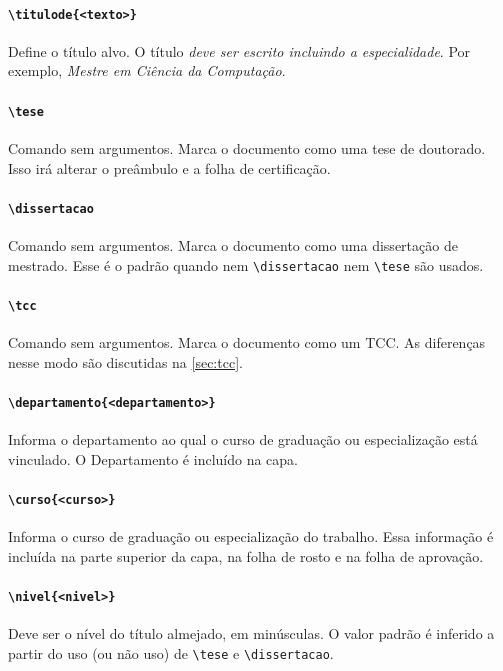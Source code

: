 \documentclass[embeddedlogo]{../ufsc-thesis-rn46-2019}
\newcommand{\lacmd}[1]{\texttt{\textbackslash{}#1}}
\begin{document}
\paragraph*{\lacmd{titulode\{<texto>\}}} Define o título alvo.  O título
\textit{deve ser escrito incluindo a especialidade}. Por exemplo, \emph{Mestre
  em Ciência da Computação}.

\paragraph*{\lacmd{tese}} Comando sem argumentos. Marca o documento como uma
tese de doutorado. Isso irá alterar o preâmbulo e a folha de certificação.

\paragraph*{\lacmd{dissertacao}} Comando sem argumentos. Marca o documento como
uma dissertação de mestrado. Esse é o padrão quando nem \lacmd{dissertacao} nem
\lacmd{tese} são usados.

\paragraph*{\lacmd{tcc}} Comando sem argumentos. Marca o documento como um
TCC. As diferenças nesse modo são discutidas na \autoref{sec:tcc}.

\paragraph*{\lacmd{departamento\{<departamento>\}}} Informa o departamento ao
qual o curso de graduação ou especialização está vinculado. O Departamento é
incluído na capa.

\paragraph*{\lacmd{curso\{<curso>\}}} Informa o curso de graduação
ou especialização do trabalho. Essa informação é incluída na parte superior da
capa, na folha de rosto e na folha de aprovação.

\paragraph*{\lacmd{nivel\{<nivel>\}}} Deve ser o nível do título almejado, em
minúsculas. O valor padrão é inferido a partir do uso (ou não uso) de
\lacmd{tese} e \lacmd{dissertacao}.
\end{document}
